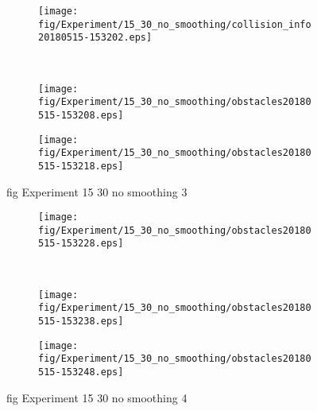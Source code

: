 \begin{figure}[H]
	\centering
	\begin{subfigure}[b]{0.45\textwidth}
		\texttt{[image: fig/Experiment/15\_30\_no\_smoothing/collision\_info20180515-153202.eps]}
		\caption{}
		\label{fig:Experiment:15_30_no_smoothing:collision_info20180515-153202}
	\end{subfigure}
	~
	\begin{subfigure}[b]{0.45\textwidth}
		\texttt{[image: fig/Experiment/15\_30\_no\_smoothing/obstacles20180515-153208.eps]}
		\caption{}
		\label{fig:Experiment:15_30_no_smoothing:obstacles20180515-153208}
	\end{subfigure}

	\begin{subfigure}[b]{0.45\textwidth}
		\texttt{[image: fig/Experiment/15\_30\_no\_smoothing/obstacles20180515-153218.eps]}
		\caption{}
		\label{fig:Experiment:15_30_no_smoothing:obstacles20180515-153218}
	\end{subfigure}
	\caption{fig Experiment 15 30 no smoothing 3}
	\label{fig:Experiment:15_30_no_smoothing:3}
\end{figure}

\begin{figure}[H]
	\centering
	\begin{subfigure}[b]{0.45\textwidth}
		\texttt{[image: fig/Experiment/15\_30\_no\_smoothing/obstacles20180515-153228.eps]}
		\caption{}
		\label{fig:Experiment:15_30_no_smoothing:obstacles20180515-153228}
	\end{subfigure}
	~
	\begin{subfigure}[b]{0.45\textwidth}
		\texttt{[image: fig/Experiment/15\_30\_no\_smoothing/obstacles20180515-153238.eps]}
		\caption{}
		\label{fig:Experiment:15_30_no_smoothing:obstacles20180515-153238}
	\end{subfigure}

	\begin{subfigure}[b]{0.45\textwidth}
		\texttt{[image: fig/Experiment/15\_30\_no\_smoothing/obstacles20180515-153248.eps]}
		\caption{}
		\label{fig:Experiment:15_30_no_smoothing:obstacles20180515-153248}
	\end{subfigure}
	\caption{fig Experiment 15 30 no smoothing 4}
	\label{fig:Experiment:15_30_no_smoothing:4}
\end{figure}

